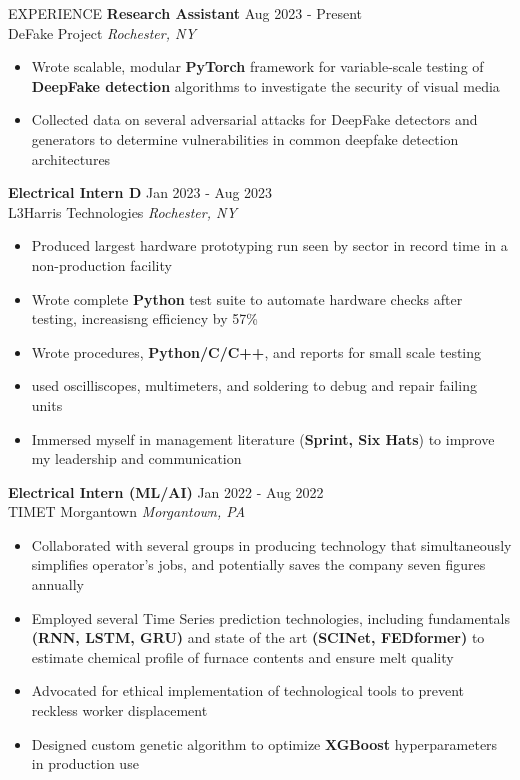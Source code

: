 \documentclass{resume} %
\begin{document}
\begin{rSection}{EXPERIENCE}
\textbf{Research Assistant} \hfill Aug 2023 - Present\\
DeFake Project \hfill \textit{Rochester, NY}
\begin{itemize}
\itemsep-3pt {}
    \item Wrote scalable, modular \textbf{PyTorch} framework for variable-scale testing of \textbf{DeepFake detection} algorithms to investigate the security of visual media
    \item Collected data on several adversarial attacks for DeepFake detectors and generators to determine vulnerabilities in common deepfake detection architectures
\end{itemize}

\textbf{Electrical Intern D} \hfill Jan 2023 - Aug 2023\\
L3Harris Technologies \hfill \textit{Rochester, NY}
\begin{itemize}
\itemsep-3pt {}
    \item Produced largest hardware prototyping run seen by sector in record time in a non-production facility
    \item Wrote complete \textbf{Python} test suite to automate hardware checks after testing, increasisng efficiency by 57\%
    \item Wrote procedures, \textbf{Python/C/C++}, and reports for small scale testing
    \item used oscilliscopes, multimeters, and soldering to debug and repair failing units
    \item Immersed myself in management literature (\textbf{Sprint, Six Hats}) to improve my leadership and communication
\end{itemize}

    \textbf{Electrical Intern (ML/AI)} \hfill Jan 2022 - Aug 2022\\
TIMET Morgantown \hfill \textit{Morgantown, PA}
 \begin{itemize}
    \itemsep-3pt {}
     \item Collaborated with several groups in producing technology that simultaneously simplifies operator’s jobs, and potentially saves the company seven figures annually
     \item Employed several Time Series prediction technologies, including fundamentals \textbf{(RNN, LSTM, GRU)} and state of the art \textbf{(SCINet, FEDformer)} to estimate chemical profile of furnace contents and ensure melt quality
     \item Advocated for ethical implementation of technological tools to prevent reckless worker displacement
     \item Designed custom genetic algorithm to optimize \textbf{XGBoost} hyperparameters in production use
 \end{itemize}

\end{rSection} 
\end{document}
